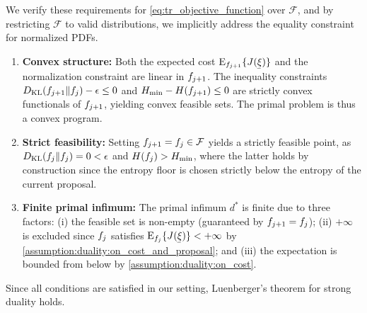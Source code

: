 We verify these requirements for \cref{eq:tr_objective_function} over $\mathcal{F}$, and by restricting $\mathcal{F}$ to valid distributions, we implicitly address the equality constraint for normalized \acp{PDF}.
\begin{enumerate}
    \item 
    \textbf{Convex structure:} Both the expected cost $\Eop_{\pdf_{j+1}}\{J(\vVarCem)\}$ and the normalization constraint are linear in $f_{j+1}$. The inequality constraints $D_{\mathrm{KL}}(f_{j+1} \Vert{} f_j) - \epsilon \le 0$ and $H_{\min} - H(f_{j+1}) \le 0$ are strictly convex functionals of $f_{j+1}$, yielding convex feasible sets. The primal problem is thus a convex program.
    \item
    \textbf{Strict feasibility:} Setting $f_{j+1} = f_j \in \mathcal{F}$ yields a strictly feasible point, as $D_{\mathrm{KL}}(f_j \Vert{} f_j) = 0 < \epsilon$ and $H(f_j) > H_{\min}$, where the latter holds by construction since the entropy floor is chosen strictly below the entropy of the current proposal.
    \item 
    \textbf{Finite primal infimum:} The primal infimum $d^*$ is finite due to three factors: 
    (i) the feasible set is non-empty (guaranteed by $f_{j+1} = f_j$);
    (ii) $+\infty$ is excluded since $f_j$ satisfies $\Eop_{\pdf_j}\{J(\vVarCem)\} < +\infty$ by \cref{assumption:duality:on_cost_and_proposal}; and
    (iii) the expectation is bounded from below by \cref{assumption:duality:on_cost}.
\end{enumerate}

Since all conditions are satisfied in our setting, Luenberger's theorem for strong duality holds. 

